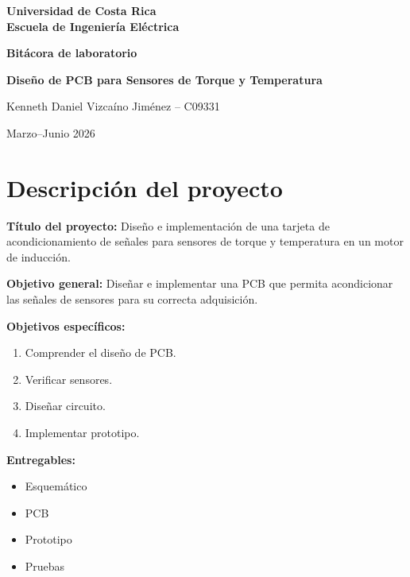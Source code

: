 \documentclass[12pt]{article}
\begin{document}
\begin{center}
\textbf{\Large Universidad de Costa Rica}\\
\vspace{0.3cm}
\textbf{Escuela de Ingeniería Eléctrica}

\vspace{2cm}

\textbf{\LARGE Bitácora de laboratorio}

\vspace{1.5cm}

\textbf{Diseño de PCB para Sensores de Torque y Temperatura}

\vspace{1.5cm}

Kenneth Daniel Vizcaíno Jiménez -- C09331

\vspace{1cm}

Marzo--Junio 2026
\end{center}

\newpage
\tableofcontents
\newpage

\section{Descripción del proyecto}

\textbf{Título del proyecto:}
Diseño e implementación de una tarjeta de acondicionamiento de señales para sensores de torque y temperatura en un motor de inducción.

\textbf{Objetivo general:}
Diseñar e implementar una PCB que permita acondicionar las señales de sensores para su correcta adquisición.

\textbf{Objetivos específicos:}
\begin{enumerate}
\item Comprender el diseño de PCB.
\item Verificar sensores.
\item Diseñar circuito.
\item Implementar prototipo.
\end{enumerate}

\textbf{Entregables:}
\begin{itemize}
\item Esquemático
\item PCB
\item Prototipo
\item Pruebas
\end{itemize}
\end{document}
